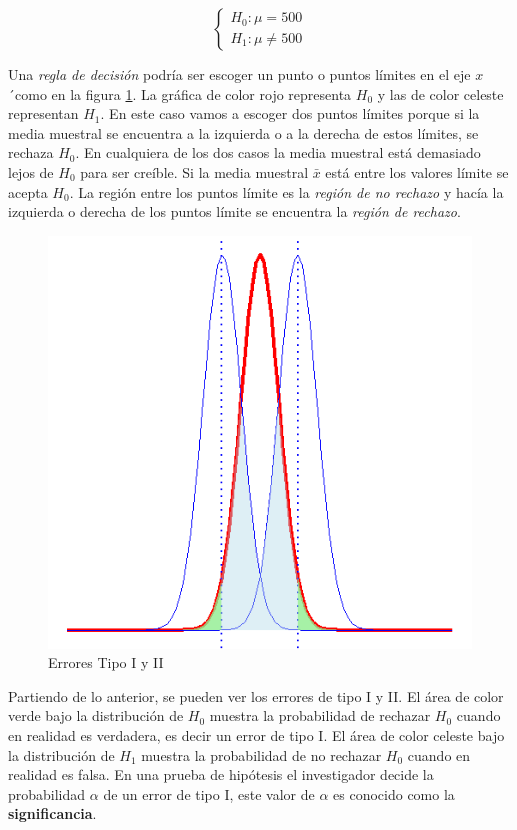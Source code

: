 \documentclass[]{book}
\begin{document}
\begin{equation} 
\begin{cases} 
H_0: \mu = 500 \\ 
H_1: \mu \neq 500
\end{cases} 
\end{equation}

Una \emph{regla de decisión} podría ser escoger un punto o puntos
límites en el eje \(x\)´como en la figura \ref{fig:pht}. La gráfica de
color rojo representa \(H_0\) y las de color celeste representan
\(H_1\). En este caso vamos a escoger dos puntos límites porque si la
media muestral se encuentra a la izquierda o a la derecha de estos
límites, se rechaza \(H_0\). En cualquiera de los dos casos la media
muestral está demasiado lejos de \(H_0\) para ser creíble. Si la media
muestral \(\bar{x}\) está entre los valores límite se acepta \(H_0\). La
región entre los puntos límite es la \emph{región de no rechazo} y hacía
la izquierda o derecha de los puntos límite se encuentra la \emph{región
de rechazo}.

\begin{figure}[h]

{\centering \includegraphics[width=0.5\linewidth]{phtest} 

}

\caption{Errores Tipo I y II}\label{fig:pht}
\end{figure}

Partiendo de lo anterior, se pueden ver los errores de tipo I y II. El
área de color verde bajo la distribución de \(H_0\) muestra la
probabilidad de rechazar \(H_0\) cuando en realidad es verdadera, es
decir un error de tipo I. El área de color celeste bajo la distribución
de \(H_1\) muestra la probabilidad de no rechazar \(H_0\) cuando en
realidad es falsa. En una prueba de hipótesis el investigador decide la
probabilidad \(\alpha\) de un error de tipo I, este valor de \(\alpha\)
es conocido como la \textbf{significancia}.
\end{document}
